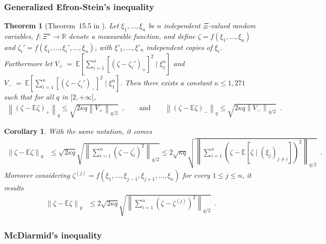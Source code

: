 \documentclass[twoside,11pt]{article}
\numberwithin{equation}{section}
\newtheorem{cor}{Corollary}[section]
\newcommand{\esp}[1]{\mathbb{E}\left[#1 \right]}
\newcommand{\gc}[1]{\left[#1\right]}
\newcommand{\1}{\mathds{1}}%
\newcommand{\paren}[1]{\left( #1 \right)}
\newcommand{\norm}[1]{\left\| #1 \right\|}
\newcommand{\R}{\mathbb{R}}
\newcommand{\E}{\mathbb{E}}
\numberwithin{equation}{section}
\theoremstyle{plain}
\newtheorem{thm}{Theorem}[section]
\begin{document}
\subsubsection{Generalized Efron-Stein's inequality}\label{subsec.generalized.efron.stein}


\begin{thm}[Theorem~15.5 in \cite{BouLugMas_2013}]
Let $\xi_1,\ldots,\xi_n$ be $n$ independent $\Xi$-valued random variables, $f : \Xi^n\rightarrow\R$ denote a measurable function, and define $\zeta=f(\xi_1,\ldots,\xi_n)$ and $\zeta_i'=f(\xi_1,\ldots,\xi_i',\ldots,\xi_n)$, with $\xi'_1,\ldots,\xi'_n$  independent copies of $\xi_i$.
%
Furthermore let $V_+~=~\esp{  \sum_{i=1} ^n \gc{\paren{\zeta-\zeta_i'}_+}^2 \mid \xi_1^n}$ and
 $V_-~=~\esp{  \sum_{i=1} ^n \gc{\paren{\zeta-\zeta_i'}_-}^2 \mid \xi_1^n}$.
%
Then there exists a constant $\kappa\leq 1,271$ such that for all $q$ in $[2,+\infty[$,
\begin{align*}
	\norm{\paren{\zeta-\E \zeta}_+}_q \leq \sqrt{2\kappa q\norm{V_+}_{q/2}}\enspace,\qquad \mbox{and}\qquad 	 \norm{\paren{\zeta-\E \zeta}_-}_q \leq \sqrt{2\kappa q\norm{V_-}_{q/2}}\enspace.
\end{align*}
\end{thm}


\begin{cor}\label{cor.generalized.Efron.Stein.appendix}
With the same notation, it comes
\begin{align}%
	\norm{ \zeta-\E\zeta }_q & \leq \sqrt{2\kappa q} \sqrt{\norm{\sum_{i=1}^n \paren{\zeta-\zeta_i^{\prime}}^2}_{q/2}}  \leq 2\sqrt{\kappa q } \sqrt{\norm{\sum_{i=1}^n \paren{\zeta-\esp{\zeta \mid (\xi_j)_{j\neq i}}}^2}_{q/2}} \label{ineg.moment.integrated.obs} \enspace.
\end{align}
%
Moreover considering $ \zeta^{(j)} = f( \xi_1, \ldots, \xi_{j-1}, \xi_{j+1}, \ldots, \xi_n) $ for every $1\leq j\leq n$, it results
\begin{eqnarray}
\norm{ \zeta-\E \zeta }_q &  \leq 2\sqrt{2\kappa q } \sqrt{ \norm{\sum_{i=1}^n \paren{\zeta-\zeta^{(j)} }^2}_{q/2}} \label{ineg.moment.removed.obs} \enspace.
\end{eqnarray}
\end{cor}


\subsubsection{McDiarmid's inequality}
\label{subsec.mc.diarmid}
\end{document}
